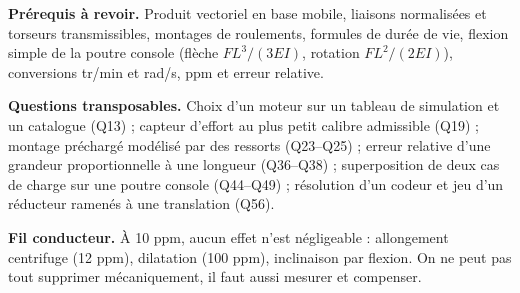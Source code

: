 \documentclass[11pt,a4paper]{article}
\begin{document}
\textbf{Prérequis à revoir.} Produit vectoriel en base mobile, liaisons normalisées et torseurs transmissibles, montages de roulements, formules de durée de vie, flexion simple de la poutre console (flèche \(FL^3/(3EI)\), rotation \(FL^2/(2EI)\)), conversions tr/min et rad/s, ppm et erreur relative.

\textbf{Questions transposables.} Choix d'un moteur sur un tableau de simulation et un catalogue (Q13) ; capteur d'effort au plus petit calibre admissible (Q19) ; montage préchargé modélisé par des ressorts (Q23--Q25) ; erreur relative d'une grandeur proportionnelle à une longueur (Q36--Q38) ; superposition de deux cas de charge sur une poutre console (Q44--Q49) ; résolution d'un codeur et jeu d'un réducteur ramenés à une translation (Q56).

\textbf{Fil conducteur.} À 10 ppm, aucun effet n'est négligeable : allongement centrifuge (12 ppm), dilatation (100 ppm), inclinaison par flexion. On ne peut pas tout supprimer mécaniquement, il faut aussi mesurer et compenser.
\end{document}
